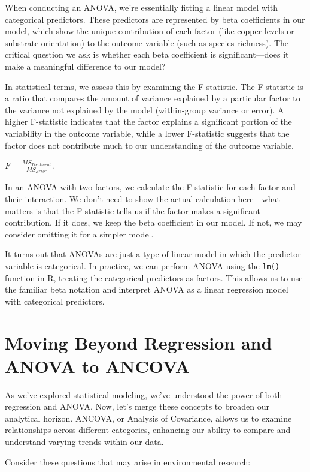 \documentclass[
  letterpaper,
  DIV=11,
  numbers=noendperiod]{scrreprt}
\begin{document}
When conducting an ANOVA, we're essentially fitting a linear model with
categorical predictors. These predictors are represented by beta
coefficients in our model, which show the unique contribution of each
factor (like copper levels or substrate orientation) to the outcome
variable (such as species richness). The critical question we ask is
whether each beta coefficient is significant---does it make a meaningful
difference to our model?

In statistical terms, we assess this by examining the F-statistic. The
F-statistic is a ratio that compares the amount of variance explained by
a particular factor to the variance not explained by the model
(within-group variance or error). A higher F-statistic indicates that
the factor explains a significant portion of the variability in the
outcome variable, while a lower F-statistic suggests that the factor
does not contribute much to our understanding of the outcome variable.

\(F = \frac{MS_{Treatment}}{MS_{Error}}\).

In an ANOVA with two factors, we calculate the F-statistic for each
factor and their interaction. We don't need to show the actual
calculation here---what matters is that the F-statistic tells us if the
factor makes a significant contribution. If it does, we keep the beta
coefficient in our model. If not, we may consider omitting it for a
simpler model.

It turns out that ANOVAs are just a type of linear model in which the
predictor variable is categorical. In practice, we can perform ANOVA
using the \texttt{lm()} function in R, treating the categorical
predictors as factors. This allows us to use the familiar beta notation
and interpret ANOVA as a linear regression model with categorical
predictors.

\section{Moving Beyond Regression and ANOVA to
ANCOVA}\label{moving-beyond-regression-and-anova-to-ancova}

As we've explored statistical modeling, we've understood the power of
both regression and ANOVA. Now, let's merge these concepts to broaden
our analytical horizon. ANCOVA, or Analysis of Covariance, allows us to
examine relationships across different categories, enhancing our ability
to compare and understand varying trends within our data.

Consider these questions that may arise in environmental research:
\end{document}
